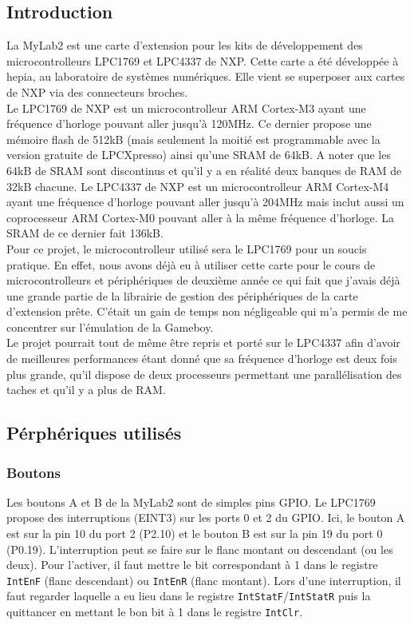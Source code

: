 \documentclass[a4paper]{article}
\begin{document}
\subsection{Introduction}
La MyLab2 est une carte d'extension pour les kits de développement des microcontrolleurs
LPC1769 et LPC4337 de NXP. Cette carte a été développée à hepia, au laboratoire
de systèmes numériques. Elle vient se superposer aux cartes de NXP via des connecteurs
broches. \\

Le LPC1769 de NXP est un microcontrolleur ARM Cortex-M3 ayant une fréquence d'horloge
pouvant aller jusqu'à 120MHz. Ce dernier propose une mémoire flash de 512kB (mais
seulement la moitié est programmable avec la version gratuite de LPCXpresso) ainsi
qu'une SRAM de 64kB. A noter que les 64kB de SRAM sont discontinus et qu'il y a en
réalité deux banques de RAM de 32kB chacune. 
Le LPC4337 de NXP est un microcontrolleur ARM Cortex-M4 ayant une fréquence d'horloge 
pouvant aller jusqu'à 204MHz mais inclut aussi un coprocesseur ARM Cortex-M0 pouvant
aller à la même fréquence d'horloge. La SRAM de ce dernier fait 136kB. \\

Pour ce projet, le microcontrolleur utilisé sera le LPC1769 pour un soucis pratique.
En effet, nous avons déjà eu à utiliser cette carte pour le cours de microcontrolleurs
et périphériques de deuxième année ce qui fait que j'avais déjà une grande partie de
la librairie de gestion des périphériques de la carte d'extension prête. C'était un
gain de temps non négligeable qui m'a permis de me concentrer sur l'émulation de
la Gameboy. \\

Le projet pourrait tout de même être repris et porté sur le LPC4337 afin d'avoir de
meilleures performances étant donné que sa fréquence d'horloge est deux fois plus
grande, qu'il dispose de deux processeurs permettant une parallélisation des taches
et qu'il y a plus de RAM.

\newpage


\subsection{Pérphériques utilisés}
\subsubsection{Boutons}
Les boutons A et B de la MyLab2 sont de simples pins GPIO. Le LPC1769 propose
des interruptions (EINT3) sur les ports 0 et 2 du GPIO. Ici, le bouton A est sur la pin
10 du port 2 (P2.10) et le bouton B est sur la pin 19 du port 0 (P0.19). L'interruption
peut se faire sur le flanc montant ou descendant (ou les deux). Pour l'activer,
il faut mettre le bit correspondant à 1 dans le registre \texttt{IntEnF}
(flanc descendant) ou \texttt{IntEnR} (flanc montant). Lors d'une interruption,
il faut regarder laquelle a eu lieu dans le registre \texttt{IntStatF}/\texttt{IntStatR}
puis la quittancer en mettant le bon bit à 1 dans le registre \texttt{IntClr}.
\end{document}
